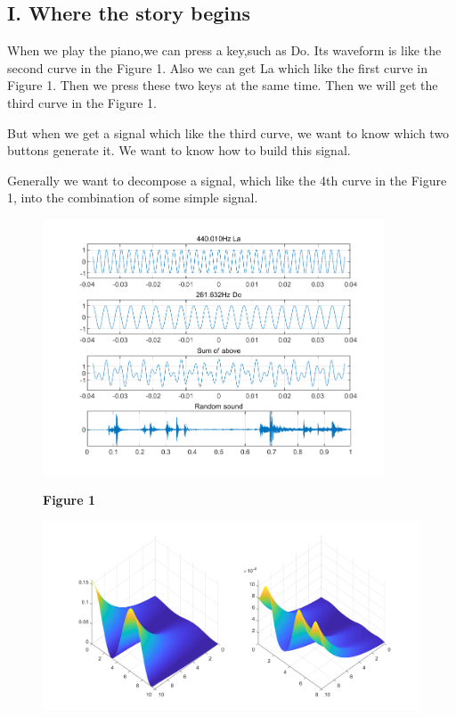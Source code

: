 \documentclass[margin,line]{res}
\begin{document}
\begin{resume}
\section{\sc I. Where the story begins}
When we play the piano,we can press a key,such as Do. Its waveform is like the second curve in the Figure 1. Also we can get La which like the first curve in Figure 1. Then we press these two keys at the same time. Then we will get the third curve in the Figure 1.\par
But when we get a signal which like the third curve, we want to know which two buttons generate it. We want to know how to build this signal.\par
Generally we want to decompose a signal, which like the 4th curve in the Figure 1, into the combination of some simple signal.\par
\begin{figure}[H]
  \begin{minipage}{0.42\linewidth}
    \centerline{\includegraphics[width=0.9\textwidth]{figure/fig_1.png}}
    \centerline{\textbf{Figure 1}}
  \end{minipage}
  \begin{minipage}{0.55\linewidth}
    \centerline{\includegraphics[width=\textwidth]{figure/fig_2.png}}

\end{minipage}
\end{figure}
\end{resume}
\end{document}
